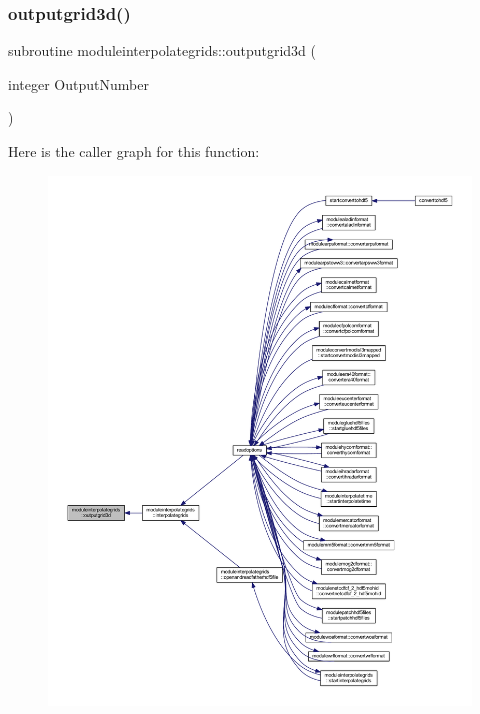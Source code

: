 \subsubsection{\texorpdfstring{outputgrid3d()}{outputgrid3d()}}
{\footnotesize\ttfamily subroutine moduleinterpolategrids\+::outputgrid3d (\begin{DoxyParamCaption}\item[{integer}]{Output\+Number }\end{DoxyParamCaption})\hspace{0.3cm}{\ttfamily [private]}}

Here is the caller graph for this function\+:\nopagebreak
\begin{figure}[H]
\begin{center}
\leavevmode
\includegraphics[width=350pt]{namespacemoduleinterpolategrids_a95af09d76985241fb13663924158fb28_icgraph}
\end{center}
\end{figure}
\mbox{\label{namespacemoduleinterpolategrids_a43f25c3ca1c96f174547603ebbf37ad0}} 
